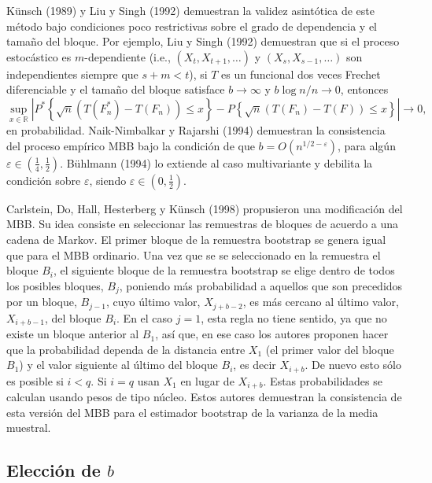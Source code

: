\documentclass[]{book}
\theoremstyle{definition}
\theoremstyle{definition}
\theoremstyle{definition}
\theoremstyle{remark}
\begin{document}
Künsch (1989) y Liu y Singh (1992) demuestran la validez asintótica de
este método bajo condiciones poco restrictivas sobre el grado de
dependencia y el tamaño del bloque. Por ejemplo, Liu y Singh (1992)
demuestran que si el proceso estocástico es \(m\)-dependiente (i.e.,
\((X_{t},X_{t+1},\ldots )\) y \((X_{s},X_{s-1},\ldots )\) son
independientes siempre que \(s+m<t\)), si \(T\) es un funcional dos
veces Frechet diferenciable y el tamaño del bloque satisface
\(b\rightarrow \infty\) y \(b\log n/n\rightarrow 0\), entonces
\[\sup_{x\in \mathbb{R}}\left\vert P^{\ast}\left\{ \sqrt{n}\left(
T(F_n^{\ast})-T\left( F_n \right) \right) \leq x\right\} -P\left\{ \sqrt{
n}\left( T(F_n)-T\left( F \right) \right) \leq x\right\} \right\vert
\rightarrow 0\mathrm{,}\]en probabilidad. Naik-Nimbalkar y Rajarshi
(1994) demuestran la consistencia del proceso empírico MBB bajo la
condición de que \(b=O(n^{1/2-\varepsilon })\), para algún
\(\varepsilon \in (\frac{1}{4},\frac{1}{2})\). Bühlmann (1994) lo
extiende al caso multivariante y debilita la condición sobre
\(\varepsilon\), siendo \(\varepsilon \in (0,\frac{1}{2})\).

Carlstein, Do, Hall, Hesterberg y Künsch (1998) propusieron una
modificación del MBB. Su idea consiste en seleccionar las remuestras de
bloques de acuerdo a una cadena de Markov. El primer bloque de la
remuestra bootstrap se genera igual que para el MBB ordinario. Una vez
que se se seleccionado en la remuestra el bloque \(B_i\), el siguiente
bloque de la remuestra bootstrap se elige dentro de todos los posibles
bloques, \(B_j\), poniendo más probabilidad a aquellos que son
precedidos por un bloque, \(B_{j-1}\), cuyo último valor, \(X_{j+b-2}\),
es más cercano al último valor, \(X_{i+b-1}\), del bloque \(B_i\). En el
caso \(j=1\), esta regla no tiene sentido, ya que no existe un bloque
anterior al \(B_1\), así que, en ese caso los autores proponen hacer que
la probabilidad dependa de la distancia entre \(X_1\) (el primer valor
del bloque \(B_1\)) y el valor siguiente al último del bloque \(B_i\),
es decir \(X_{i+b}\). De nuevo esto sólo es posible si \(i<q\). Si
\(i=q\) usan \(X_1\) en lugar de \(X_{i+b}\). Estas probabilidades se
calculan usando pesos de tipo núcleo. Estos autores demuestran la
consistencia de esta versión del MBB para el estimador bootstrap de la
varianza de la media muestral.

\subsection{\texorpdfstring{Elección de
\(b\)}{Elección de b}}\label{eleccion-de-b}
\end{document}
